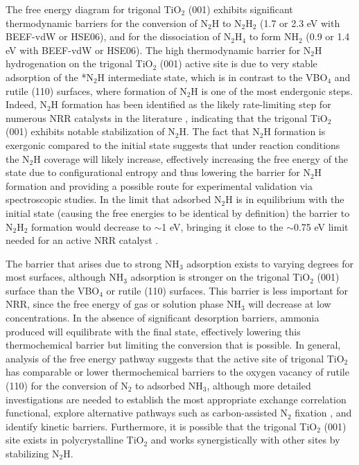 The free energy diagram for trigonal TiO$_2$ (001) exhibits significant thermodynamic barriers for the conversion of N$_2$H to N$_2$H$_2$ (1.7 or 2.3 eV with BEEF-vdW or HSE06), and for the dissociation of N$_2$H$_4$ to form NH$_2$ (0.9 or 1.4 eV with BEEF-vdW or HSE06). The high thermodynamic barrier for N$_2$H hydrogenation on the trigonal TiO$_2$ (001) active site is due to very stable adsorption of the *N$_2$H intermediate state, which is in contrast to the VBO$_4$ and rutile (110) surfaces, where formation of N$_2$H is one of the most endergonic steps. Indeed, N$_2$H formation has been identified as the likely rate-limiting step for numerous NRR catalysts in the literature \cite{Skulason_2012, Ji2023UnifyingSurfaces,Bourgeois1988AAmmonia}, indicating that the trigonal TiO$_2$ (001) exhibits notable stabilization of N$_2$H. The fact that N$_2$H formation is exergonic compared to the initial state suggests that under reaction conditions the N$_2$H coverage will likely increase, effectively increasing the free energy of the state due to configurational entropy and thus lowering the barrier for N$_2$H formation and providing a possible route for experimental validation via spectroscopic studies. In the limit that adsorbed N$_2$H is in equilibrium with the initial state (causing the free energies to be identical by definition) the barrier to N$_2$H$_2$ formation would decrease to $\sim$1 eV, bringing it close to the $\sim$0.75 eV limit needed for an active NRR catalyst \cite{Iriawan_2021}. 

The barrier that arises due to strong NH$_3$ adsorption exists to varying degrees for most surfaces, although NH$_3$ adsorption is stronger on the trigonal TiO$_2$ (001) surface than the VBO$_4$ or rutile (110) surfaces. This barrier is less important for NRR, since the free energy of gas or solution phase NH$_3$ will decrease at low concentrations. In the absence of significant desorption barriers, ammonia produced will equilibrate with the final state, effectively lowering this thermochemical barrier but limiting the conversion that is possible. In general, analysis of the free energy pathway suggests that the active site of trigonal TiO$_2$ has comparable or lower thermochemical barriers to the oxygen vacancy of rutile (110) for the conversion of N$_2$ to adsorbed NH$_3$, although more detailed investigations are needed to establish the most appropriate exchange correlation functional, explore alternative pathways such as carbon-assisted N$_2$ fixation \cite{Comer2018TheTitania}, and identify kinetic barriers. Furthermore, it is possible that the trigonal TiO$_2$ (001) site exists in polycrystalline TiO$_2$ and works synergistically with other sites by stabilizing N$_2$H.

